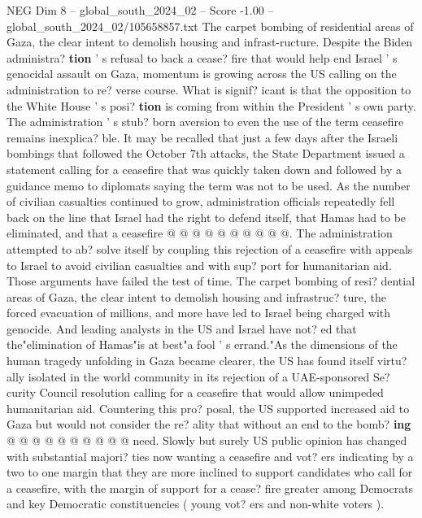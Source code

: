 \begin{textsample}{NEG Dim 8 – global\_south\_2024\_02 – Score -1.00 – global\_south\_2024\_02/105658857.txt}  \label{ex:f8_neg_066}
The carpet bombing of residential areas of Gaza, the clear intent to demolish housing and infrast-ructure.
Despite the Biden administra? \textbf{tion} ' s refusal to back a cease? fire that would help end Israel ' s genocidal assault on Gaza, momentum is growing across the US calling on the administration to re? verse course.
What is signif? icant is that the opposition to the White House ' s posi? \textbf{tion} is coming from within the President ' s own party.
The administration ' s stub? born aversion to even the use of the term ceasefire remains inexplica? ble.
It may be recalled that just a few days after the Israeli bombings that followed the October 7th attacks, the State Department issued a statement calling for a ceasefire that was quickly taken down and followed by a guidance memo to diplomats saying the term was not to be used.
As the number of civilian casualties continued to grow, administration officials repeatedly fell back on the line that Israel had the right to defend itself, that Hamas had to be eliminated, and that a ceasefire @ @ @ @ @ @ @ @ @ @.
The administration attempted to ab? solve itself by coupling this rejection of a ceasefire with appeals to Israel to avoid civilian casualties and with sup? port for humanitarian aid.
Those arguments have failed the test of time.
The carpet bombing of resi? dential areas of Gaza, the clear intent to demolish housing and infrastruc? ture, the forced evacuation of millions, and more have led to Israel being charged with genocide.
And leading analysts in the US and Israel have not? ed that the"elimination of Hamas"is at best"a fool ' s errand."As the dimensions of the human tragedy unfolding in Gaza became clearer, the US has found itself virtu? ally isolated in the world community in its rejection of a UAE-sponsored Se? curity Council resolution calling for a ceasefire that would allow unimpeded humanitarian aid.
Countering this pro? posal, the US supported increased aid to Gaza but would not consider the re? ality that without an end to the bomb? \textbf{ing} @ @ @ @ @ @ @ @ @ @ need.
Slowly but surely US public opinion has changed with substantial majori? ties now wanting a ceasefire and vot? ers indicating by a two to one margin that they are more inclined to support candidates who call for a ceasefire, with the margin of support for a cease? fire greater among Democrats and key Democratic constituencies ( young vot? ers and non-white voters ).

\end{textsample}
